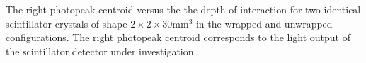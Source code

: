 \label{fig:lightoutput} The right photopeak centroid versus the the depth of interaction for two identical scintillator crystals of shape $2\times2\times30$mm$^3$ in the wrapped and unwrapped configurations. The right photopeak centroid corresponds to the light output of the scintillator detector under investigation.